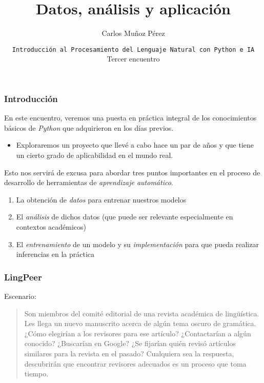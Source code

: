 \documentclass{beamer}
\title[Datos y aplicación]{Datos, análisis y aplicación}
\institute[]{}
\date[Día 3]{\footnotesize\texttt{Introducción al Procesamiento del Lenguaje Natural con Python e IA}\\ \vspace{10pt} Tercer encuentro}
\author[C. Mu\~{n}oz P\'{e}rez]{Carlos Mu\~{n}oz P\'{e}rez}
\begin{document}
	\frame{\titlepage}
	

\begin{frame}
\frametitle{Introducción}

En este encuentro, veremos una puesta en práctica integral de los conocimientos básicos de \alert{\textit{Python}} que adquirieron en los días previos.

\begin{itemize}
\item[\ding{229}] Exploraremos un proyecto que llevé a cabo hace un par de años y que tiene un cierto grado de aplicabilidad en el mundo real.
\end{itemize}


Esto nos servirá de excusa para abordar tres puntos importantes en el proceso de desarrollo de herramientas de \alert{\textit{aprendizaje automático}}.


\begin{enumerate}
\item La obtención de \alert{\textit{datos}} para entrenar nuestros modelos


\item El \alert{\textit{análisis}} de dichos datos (que puede ser relevante especialmente en contextos académicos)


\item El \alert{\textit{entrenamiento}} de un modelo y su \alert{\textit{implementación}} para que pueda realizar inferencias en la práctica
\end{enumerate}


\end{frame}


\begin{frame}
\frametitle{LingPeer}

Escenario:

\vspace{10pt}

\begin{quote}
Son miembros del comité editorial de una revista académica de lingüística. Les llega un nuevo manuscrito acerca de algún tema oscuro de gramática. ¿Cómo elegirían a los revisores para ese artículo? ¿Contactarían a algún conocido? ¿Buscarían en Google? ¿Se fijarían quién revisó artículos similares para la revista en el pasado? Cualquiera sea la respuesta, descubrirán que encontrar revisores adecuados es un proceso que toma tiempo.
\end{quote}

\end{frame}
\end{document}
